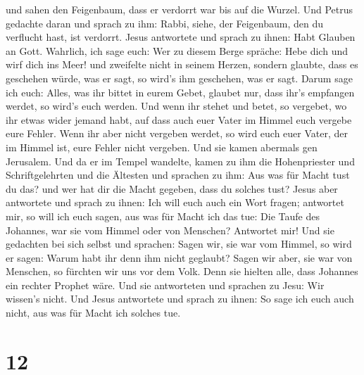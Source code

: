 und sahen den Feigenbaum, dass er verdorrt war bis auf die Wurzel.
 Und Petrus gedachte daran und sprach zu ihm: Rabbi,
siehe, der Feigenbaum, den du verflucht hast, ist verdorrt.
 Jesus antwortete und sprach zu ihnen: Habt Glauben an
Gott.  Wahrlich, ich sage euch: Wer zu diesem Berge
spräche: Hebe dich und wirf dich ins Meer! und zweifelte nicht in seinem
Herzen, sondern glaubte, dass es geschehen würde, was er sagt, so wird's
ihm geschehen, was er sagt.  Darum sage ich euch: Alles,
was ihr bittet in eurem Gebet, glaubet nur, dass ihr's empfangen werdet,
so wird's euch werden.  Und wenn ihr stehet und betet, so
vergebet, wo ihr etwas wider jemand habt, auf dass auch euer Vater im
Himmel euch vergebe eure Fehler.  Wenn ihr aber nicht
vergeben werdet, so wird euch euer Vater, der im Himmel ist, eure Fehler
nicht vergeben.  Und sie kamen abermals gen Jerusalem.
Und da er im Tempel wandelte, kamen zu ihm die Hohenpriester und
Schriftgelehrten und die Ältesten  und sprachen zu ihm:
Aus was für Macht tust du das? und wer hat dir die Macht gegeben, dass
du solches tust?  Jesus aber antwortete und sprach zu
ihnen: Ich will euch auch ein Wort fragen; antwortet mir, so will ich
euch sagen, aus was für Macht ich das tue:  Die Taufe des
Johannes, war sie vom Himmel oder von Menschen? Antwortet mir!
 Und sie gedachten bei sich selbst und sprachen: Sagen
wir, sie war vom Himmel, so wird er sagen: Warum habt ihr denn ihm nicht
geglaubt?  Sagen wir aber, sie war von Menschen, so
fürchten wir uns vor dem Volk. Denn sie hielten alle, dass Johannes ein
rechter Prophet wäre.  Und sie antworteten und sprachen
zu Jesu: Wir wissen's nicht. Und Jesus antwortete und sprach zu ihnen:
So sage ich euch auch nicht, aus was für Macht ich solches tue.

\hypertarget{section-11}{%
\section{12}\label{section-11}}

